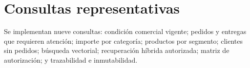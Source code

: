 \section{Consultas representativas}
Se implementan nueve consultas: condición comercial vigente; pedidos y entregas que requieren atención; importe por categoría; productos por segmento; clientes sin pedidos; búsqueda vectorial; recuperación híbrida autorizada; matriz de autorización; y trazabilidad e inmutabilidad.

